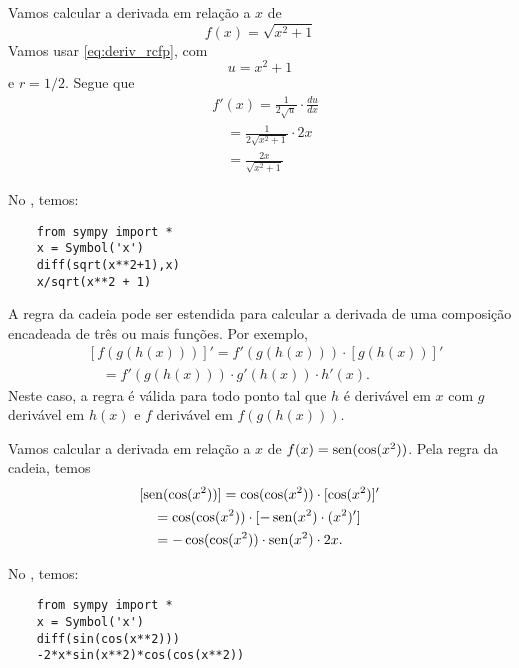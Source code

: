 \begin{ex}
  Vamos calcular a derivada em relação a $x$ de
  \begin{equation}
    f(x) = \sqrt{x^2+1}
  \end{equation}
  Vamos usar \eqref{eq:deriv_rcfp}, com
  \begin{equation}
    u = x^2 + 1
  \end{equation}
  e $r = 1/2$. Segue que
  \begin{align}
    & f'(x) = \frac{1}{2\sqrt{u}}\cdot \frac{d u}{d x} \\
    & \text{}\quad = \frac{1}{2\sqrt{x^2+1}}\cdot 2x\\
    & \text{}\quad = \frac{2x}{\sqrt{x^2+1}}
  \end{align}

  \ifispython
  No \sympy, temos:
\begin{lstlisting}
    from sympy import *
    x = Symbol('x')
    diff(sqrt(x**2+1),x)
    x/sqrt(x**2 + 1)
  \end{lstlisting}
  \fi  
\end{ex}

A regra da cadeia pode ser estendida para calcular a derivada de uma composição encadeada de três ou mais funções. Por exemplo,
\begin{align}
  & [f(g(h(x)))]' = f'(g(h(x)))\cdot[g(h(x))]' \\
  & \text{}\quad = f'(g(h(x)))\cdot g'(h(x))\cdot h'(x).
\end{align}
Neste caso, a regra é válida para todo ponto tal que $h$ é derivável em $x$ com $g$ derivável em $h(x)$ e $f$ derivável em $f(g(h(x)))$.

\begin{ex}
  Vamos calcular a derivada em relação a $x$ de $f(x) = \operatorname{sen}(\cos(x^2))$. Pela regra da cadeia, temos
  \begin{align}
    & [\operatorname{sen}(\cos(x^2))] = \cos(\cos(x^2))\cdot[\cos(x^2)]' \\
    & \text{}\quad = \cos(\cos(x^2))\cdot [-\operatorname{sen}(x^2)\cdot (x^2)'] \\
    & \text{}\quad = -\cos(\cos(x^2))\cdot\operatorname{sen}(x^2)\cdot 2x.
  \end{align}

  \ifispython
  No \sympy, temos:
  \begin{lstlisting}
    from sympy import *
    x = Symbol('x')
    diff(sin(cos(x**2)))
    -2*x*sin(x**2)*cos(cos(x**2))
  \end{lstlisting}
  \fi  
\end{ex}

